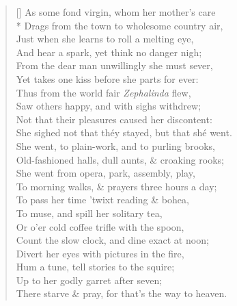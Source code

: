 \documentclass[MAIN]{subfiles}
\begin{document}
\settowidth{\versewidth}{She sighed not that th\'ey stayed, but that sh\'e went.}
\begin{verse}[\versewidth]
As some fond virgin, whom her mother's care\\*
Drags from the town to wholesome country air,\\
Just when she learns to roll a melting eye,\\
And hear a spark, yet think no danger nigh;\\
From the dear man unwillingly she must sever,\\
Yet takes one kiss before she parts for ever:\\
Thus from the world fair \emph{Zephalinda} flew,\\
Saw others happy, and with sighs withdrew;\\
Not that their pleasures caused her discontent:\\
She sighed not that th\'ey stayed, but that sh\'e went.\\
She went, to plain-work, and to purling brooks,\\
Old-fashioned halls, dull aunts, \& croaking rooks;\\
She went from opera, park, assembly, play,\\
To morning walks, \& prayers three hours a day;\\
To pass her time 'twixt reading \& bohea,\\
To muse, and spill her solitary tea,\\
Or o'er cold coffee trifle with the spoon,\\
Count the slow clock, and dine exact at noon;\\
Divert her eyes with pictures in the fire,\\
Hum  a tune, tell stories to the squire;\\
Up to her godly garret after seven;\\
There starve \& pray, for that's the way to heaven.\\

\end{verse}
\end{document}
